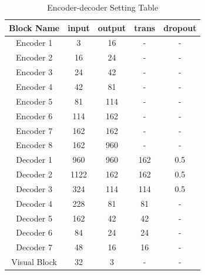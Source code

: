 \documentclass[a4paper, times, 10pt,twocolumn]{article}
\begin{document}
\begin{table}[h]
	\caption{Encoder-decoder Setting Table}
	\label{tab:encoder_setting}
	\begin{tabular}{ccccc}
		\hline
		Block Name   & input & output & trans & dropout \\
		\hline
		Encoder 1    & 3     & 16     & -     & -       \\
		Encoder 2    & 16    & 24     & -     & -       \\
		Encoder 3    & 24    & 42     & -     & -       \\
		Encoder 4    & 42    & 81     & -     & -       \\
		Encoder 5    & 81    & 114    & -     & -       \\
		Encoder 6    & 114   & 162    & -     & -       \\
		Encoder 7    & 162   & 162    & -     & -       \\
		Encoder 8    & 162   & 960    & -     & -       \\
		Decoder 1    & 960   & 960    & 162   & 0.5     \\
		Decoder 2    & 1122  & 162    & 162   & 0.5     \\
		Decoder 3    & 324   & 114    & 114   & 0.5     \\
		Decoder 4    & 228   & 81     & 81    & -       \\
		Decoder 5    & 162   & 42     & 42    & -       \\
		Decoder 6    & 84    & 24     & 24    & -       \\
		Decoder 7    & 48    & 16     & 16    & -       \\
		Visual Block & 32    & 3      & -     & -       \\
		\hline
	\end{tabular}
\end{table}
\end{document}
